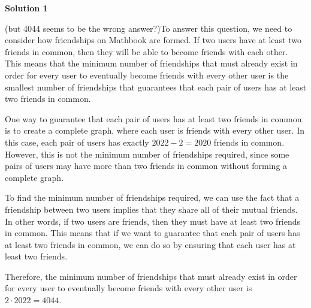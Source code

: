 \begin{enumerate}
 



\textbf{Solution 1}

(but 4044 seems to be the wrong answer?)To answer this question, we need to consider how friendships on Mathbook are formed. If two users have at least two friends in common, then they will be able to become friends with each other. This means that the minimum number of friendships that must already exist in order for every user to eventually become friends with every other user is the smallest number of friendships that guarantees that each pair of users has at least two friends in common.

 One way to guarantee that each pair of users has at least two friends in common is to create a complete graph, where each user is friends with every other user. In this case, each pair of users has exactly $2022 - 2 = 2020$ friends in common. However, this is not the minimum number of friendships required, since some pairs of users may have more than two friends in common without forming a complete graph.

 To find the minimum number of friendships required, we can use the fact that a friendship between two users implies that they share all of their mutual friends. In other words, if two users are friends, then they must have at least two friends in common. This means that if we want to guarantee that each pair of users has at least two friends in common, we can do so by ensuring that each user has at least two friends.

 Therefore, the minimum number of friendships that must already exist in order for every user to eventually become friends with every other user is $2 \cdot 2022 = \boxed{4044}$.

 


\end{enumerate}
